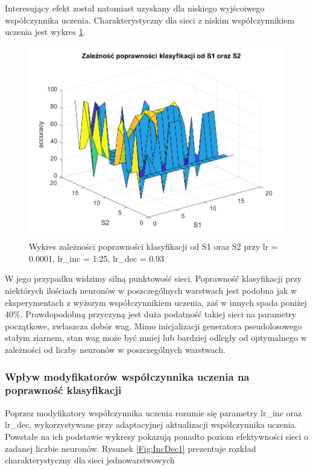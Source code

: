 \documentclass[12pt,twoside]{article}
\begin{document}
Interesujący efekt został natomiast uzyskany dla niskiego wyjścoiwego współczynnika uczenia.
Charakterystyczny dla sieci z niskim współczynnikiem uczenia jest wykres \ref{Fig:S1S2_2}.


\begin{figure}[ht]
	\centering
	\includegraphics[width=16cm]{figures/S1S2_2.png}
	\caption{Wykres zależności poprawności klasyfikacji od S1 oraz S2 przy lr = 0.0001, lr\_inc = 1.25, lr\_dec = 0.93}
	\label{Fig:S1S2_2}
\end{figure}

W jego przypadku widzimy silną punktowość sieci.
Poprawność klasyfikacji przy niektórych ilościach neuronów w poszczególnych warstwach jest podobna jak w eksperymentach z wyższym współczynnikiem uczenia, zaś w innych spada poniżej 40\%.
Prawdopodobną przyczyną jest duża podatność takiej sieci na parametry początkowe, zwłaszcza dobór wag.
Mimo inicjalizacji generatora pseudolosowego stałym ziarnem, stan wag może być mniej lub bardziej odległy od optymalnego w zależności od liczby neuronów w poszczególnych warstwach.

\clearpage
\subsubsection{Wpływ modyfikatorów współczynnika uczenia na poprawność klasyfikacji}
Poprzez modyfikatory współczynnika uczenia rozumie się parametry lr\_inc oraz lr\_dec, wykorzystywane przy adaptacyjnej aktualizacji współczynnika uczenia.
Powstałe na ich podstawie wykresy pokazują ponadto poziom efektywności sieci o zadanej liczbie neuronów.
Rysunek \ref{Fig:IncDec1} prezentuje rozkład charakterystyczny dla sieci jednowarstwowych
\end{document}

